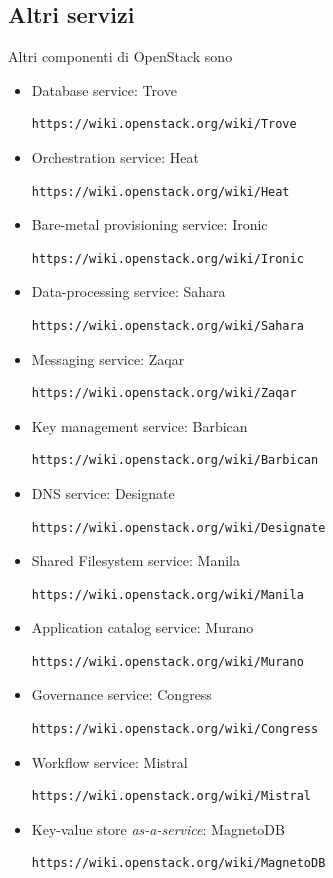 \subsection{Altri servizi}
Altri componenti di OpenStack sono
\begin{itemize}
\item{Database service: Trove}
\begin{Verbatim}[frame=single]
https://wiki.openstack.org/wiki/Trove
\end{Verbatim}
\item{Orchestration service: Heat}
\begin{Verbatim}[frame=single]
https://wiki.openstack.org/wiki/Heat
\end{Verbatim}
\item{Bare-metal provisioning service: Ironic}
\begin{Verbatim}[frame=single]
https://wiki.openstack.org/wiki/Ironic
\end{Verbatim}
\item{Data-processing service: Sahara}
\begin{Verbatim}[frame=single]
https://wiki.openstack.org/wiki/Sahara
\end{Verbatim}
\item{Messaging service: Zaqar}
\begin{Verbatim}[frame=single]
https://wiki.openstack.org/wiki/Zaqar
\end{Verbatim}
\item{Key management service: Barbican}
\begin{Verbatim}[frame=single]
https://wiki.openstack.org/wiki/Barbican
\end{Verbatim}
\item{DNS service: Designate}
\begin{Verbatim}[frame=single]
https://wiki.openstack.org/wiki/Designate
\end{Verbatim}
\item{Shared Filesystem service: Manila}
\begin{Verbatim}[frame=single]
https://wiki.openstack.org/wiki/Manila
\end{Verbatim}
\item{Application catalog service: Murano}
\begin{Verbatim}[frame=single]
https://wiki.openstack.org/wiki/Murano
\end{Verbatim}
\item{Governance service: Congress}
\begin{Verbatim}[frame=single]
https://wiki.openstack.org/wiki/Congress
\end{Verbatim}
\item{Workflow service: Mistral}
\begin{Verbatim}[frame=single]
https://wiki.openstack.org/wiki/Mistral
\end{Verbatim}
\item{Key-value store \textit{as-a-service}: MagnetoDB}
\begin{Verbatim}[frame=single]
https://wiki.openstack.org/wiki/MagnetoDB
\end{Verbatim}
\end{itemize}


